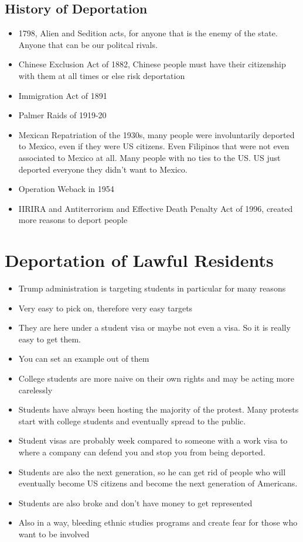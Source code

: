 \documentclass{article}
\begin{document}
\subsection{History of Deportation}
\begin{itemize}
  \item 1798, Alien and Sedition acts, for anyone that is the enemy of the state.
    Anyone that can be our politcal rivals.
  \item Chinese Exclusion Act of 1882, Chinese people must have their citizenship
    with them at all times or else risk deportation
  \item Immigration Act of 1891
  \item Palmer Raids of 1919-20
  \item Mexican Repatriation of the 1930s, many people were involuntarily deported
    to Mexico, even if they were US citizens. Even Filipinos that were not even
    associated to Mexico at all. Many people with no ties to the US. US just deported
    everyone they didn't want to Mexico.
  \item Operation Weback in 1954
  \item IIRIRA and Antiterrorism and Effective Death Penalty Act of 1996,
    created more reasons to deport people
\end{itemize}

\section*{Deportation of Lawful Residents}
\begin{itemize}
  \item Trump administration is targeting students in particular for many reasons
  \item Very easy to pick on, therefore very easy targets
  \item They are here under a student visa or maybe not even a visa. So it is really
    easy to get them.
  \item You can set an example out of them
  \item College students are more naive on their own rights and may
    be acting more carelessly
  \item Students have always been hosting the majority of the protest.
    Many protests start with college students and eventually spread to
    the public.
  \item Student visas are probably week compared to someone with a work visa
    to where a company can defend you and stop you from being deported.
  \item Students are also the next generation, so he can get rid of 
    people who will eventually become US citizens and become the next generation
    of Americans.
  \item Students are also broke and don't have money to get represented
  \item Also in a way, bleeding ethnic studies programs and create fear for those
    who want to be involved
\end{itemize}
\end{document}
